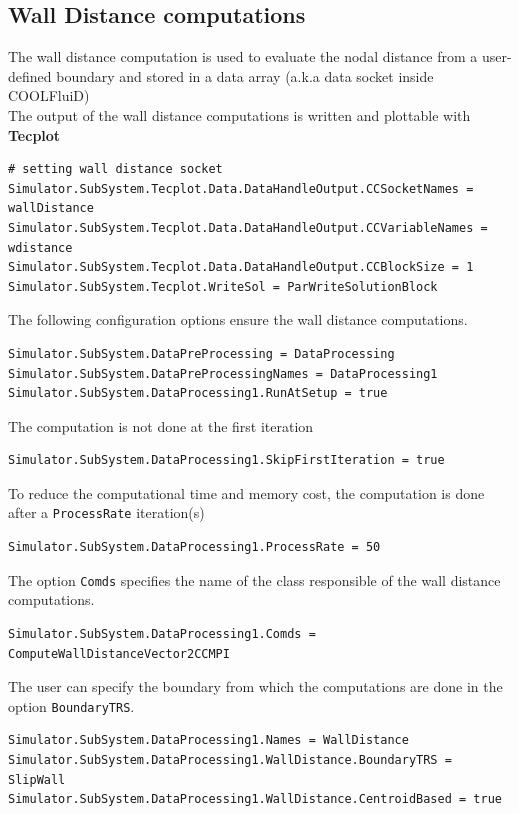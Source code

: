 \documentclass[11pt]{article}
\begin{document}
\subsection{Wall Distance computations}
The wall distance computation is used to evaluate the nodal distance from a user-defined boundary and stored in a data array (a.k.a data socket inside COOLFluiD)\\ 
The output of the wall distance computations is written and plottable with \textbf{Tecplot}
\begin{lstlisting}[breaklines]
# setting wall distance socket
Simulator.SubSystem.Tecplot.Data.DataHandleOutput.CCSocketNames = wallDistance
Simulator.SubSystem.Tecplot.Data.DataHandleOutput.CCVariableNames = wdistance
Simulator.SubSystem.Tecplot.Data.DataHandleOutput.CCBlockSize = 1
Simulator.SubSystem.Tecplot.WriteSol = ParWriteSolutionBlock
\end{lstlisting}
The following configuration options ensure the wall distance computations.

\begin{lstlisting}[breaklines]
Simulator.SubSystem.DataPreProcessing = DataProcessing
Simulator.SubSystem.DataPreProcessingNames = DataProcessing1
Simulator.SubSystem.DataProcessing1.RunAtSetup = true
\end{lstlisting}
The computation is not done at the first iteration
\begin{lstlisting}[breaklines]
Simulator.SubSystem.DataProcessing1.SkipFirstIteration = true
\end{lstlisting}
To reduce the computational time and memory cost, the computation is done after a {\tt ProcessRate} iteration(s)
\begin{lstlisting}[breaklines]
Simulator.SubSystem.DataProcessing1.ProcessRate = 50
\end{lstlisting}
The option {\tt Comds} specifies the name of the class responsible of the wall distance computations.
\begin{lstlisting}[breaklines]
Simulator.SubSystem.DataProcessing1.Comds = ComputeWallDistanceVector2CCMPI
\end{lstlisting}
The user can specify the boundary from which the computations are done in the option {\tt BoundaryTRS}.
\begin{lstlisting}[breaklines]
Simulator.SubSystem.DataProcessing1.Names = WallDistance
Simulator.SubSystem.DataProcessing1.WallDistance.BoundaryTRS = SlipWall
Simulator.SubSystem.DataProcessing1.WallDistance.CentroidBased = true
\end{lstlisting}
\end{document}
